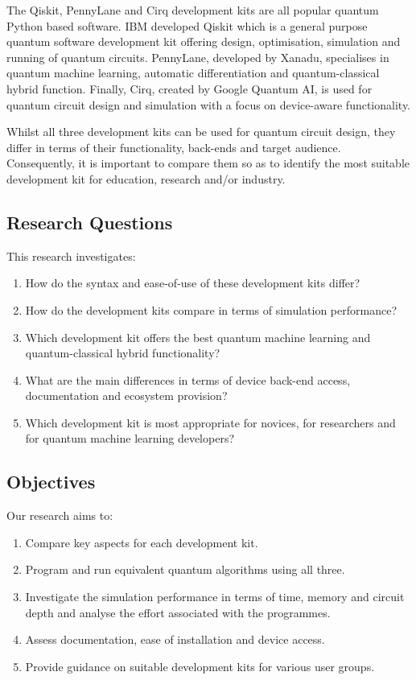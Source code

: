 \documentclass[journal]{IEEEtran}
\begin{document}
The Qiskit, PennyLane and Cirq development kits are all popular quantum Python based software. IBM developed Qiskit which is a general purpose quantum software development kit offering design, optimisation, simulation and running of quantum circuits. PennyLane, developed by Xanadu, specialises in quantum machine learning, automatic differentiation and quantum-classical hybrid function. Finally, Cirq, created by Google Quantum AI, is used for quantum circuit design and simulation with a focus on device-aware functionality.

Whilst all three development kits can be used for quantum circuit design, they differ in terms of their functionality, back-ends and target audience. Consequently, it is important to compare them so as to identify the most suitable development kit for education, research and/or industry.

\subsection{Research Questions}
This research investigates:
\begin{enumerate}
\item How do the syntax and ease-of-use of these development kits differ?
\item How do the development kits compare in terms of simulation performance?
\item Which development kit offers the best quantum machine learning and quantum-classical hybrid functionality?
\item What are the main differences in terms of device back-end access, documentation and ecosystem provision?
\item Which development kit is most appropriate for novices, for researchers and for quantum machine learning developers?
\end{enumerate}

\subsection{Objectives}
Our research aims to:
\begin{enumerate}
\item Compare key aspects for each development kit.
\item Program and run equivalent quantum algorithms using all three.
\item Investigate the simulation performance in terms of time, memory and circuit depth and analyse the effort associated with the programmes.
\item Assess documentation, ease of installation and device access.
\item Provide guidance on suitable development kits for various user groups.
\end{enumerate}
\end{document}
